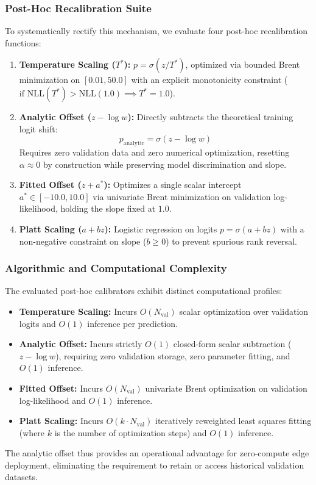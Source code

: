 \documentclass[preprint,12pt]{elsarticle}
\begin{document}
\subsubsection{Post-Hoc Recalibration Suite}
To systematically rectify this mechanism, we evaluate four post-hoc recalibration functions:
\begin{enumerate}
    \item \textbf{Temperature Scaling ($T^*$):} $p = \sigma(z / T^*)$, optimized via bounded Brent minimization on $[0.01, 50.0]$ with an explicit monotonicity constraint ($\text{if } \text{NLL}(T^*) > \text{NLL}(1.0) \implies T^* = 1.0$).
    \item \textbf{Analytic Offset ($z - \log w$):} Directly subtracts the theoretical training logit shift:
    \begin{equation}
    p_{\text{analytic}} = \sigma(z - \log w)
    \end{equation}
    Requires zero validation data and zero numerical optimization, resetting $\alpha \approx 0$ by construction while preserving model discrimination and slope.
    \item \textbf{Fitted Offset ($z + a^*$):} Optimizes a single scalar intercept $a^* \in [-10.0, 10.0]$ via univariate Brent minimization on validation log-likelihood, holding the slope fixed at $1.0$.
    \item \textbf{Platt Scaling ($a + bz$):} Logistic regression on logits $p = \sigma(a + bz)$ with a non-negative constraint on slope ($b \ge 0$) to prevent spurious rank reversal.
\end{enumerate}

\subsubsection{Algorithmic and Computational Complexity}
The evaluated post-hoc calibrators exhibit distinct computational profiles:
\begin{itemize}
    \item \textbf{Temperature Scaling:} Incurs $O(N_{\mathrm{val}})$ scalar optimization over validation logits and $O(1)$ inference per prediction.
    \item \textbf{Analytic Offset:} Incurs strictly $O(1)$ closed-form scalar subtraction ($z - \log w$), requiring zero validation storage, zero parameter fitting, and $O(1)$ inference.
    \item \textbf{Fitted Offset:} Incurs $O(N_{\mathrm{val}})$ univariate Brent optimization on validation log-likelihood and $O(1)$ inference.
    \item \textbf{Platt Scaling:} Incurs $O(k \cdot N_{\mathrm{val}})$ iteratively reweighted least squares fitting (where $k$ is the number of optimization steps) and $O(1)$ inference.
\end{itemize}
The analytic offset thus provides an operational advantage for zero-compute edge deployment, eliminating the requirement to retain or access historical validation datasets.
\end{document}
